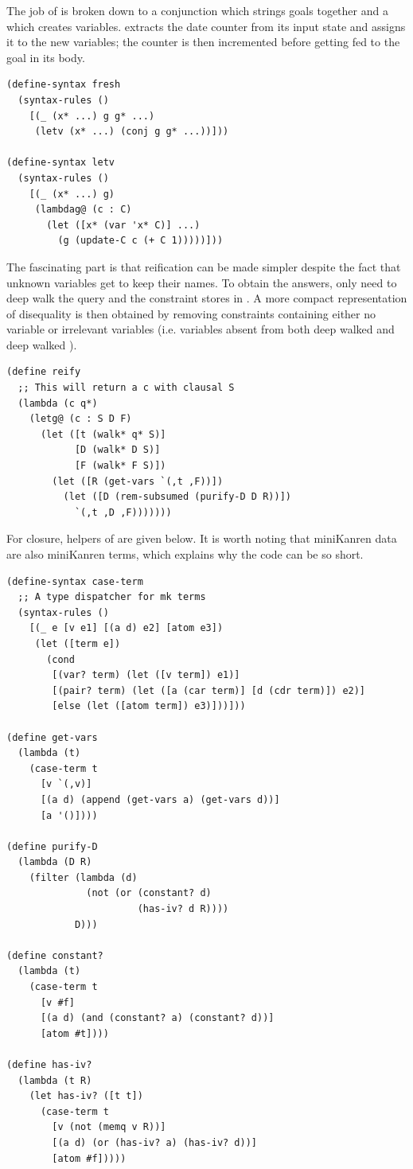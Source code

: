 The job of  is broken down to a conjunction which strings goals together and a  which creates variables.  extracts the date counter from its input state and assigns it to the new variables; the counter is then incremented before getting fed to the goal in its body.
\begin{lstlisting}
(define-syntax fresh
  (syntax-rules ()
    [(_ (x* ...) g g* ...)
     (letv (x* ...) (conj g g* ...))]))

(define-syntax letv
  (syntax-rules ()
    [(_ (x* ...) g)
     (lambdag@ (c : C)
       (let ([x* (var 'x* C)] ...)
         (g (update-C c (+ C 1)))))]))
\end{lstlisting}

The fascinating part is that reification can be made simpler despite the fact that unknown variables get to keep their names. To obtain the answers,  only need to deep walk the query and the constraint stores in . A more compact representation of disequality is then obtained by removing constraints containing either no variable or irrelevant variables (i.e. variables absent from both deep walked  and deep walked ).
\begin{lstlisting}
(define reify
  ;; This will return a c with clausal S
  (lambda (c q*)
    (letg@ (c : S D F)
      (let ([t (walk* q* S)]
            [D (walk* D S)]
            [F (walk* F S)])
        (let ([R (get-vars `(,t ,F))])
          (let ([D (rem-subsumed (purify-D D R))])
            `(,t ,D ,F)))))))
\end{lstlisting}

For closure, helpers of  are given below. It is worth noting that miniKanren data are also miniKanren terms, which explains why the code can be so short.
\begin{lstlisting}
(define-syntax case-term
  ;; A type dispatcher for mk terms
  (syntax-rules ()
    [(_ e [v e1] [(a d) e2] [atom e3])
     (let ([term e])
       (cond
        [(var? term) (let ([v term]) e1)]
        [(pair? term) (let ([a (car term)] [d (cdr term)]) e2)]
        [else (let ([atom term]) e3)]))]))

(define get-vars
  (lambda (t)
    (case-term t
      [v `(,v)]
      [(a d) (append (get-vars a) (get-vars d))]
      [a '()])))

(define purify-D
  (lambda (D R)
    (filter (lambda (d)
              (not (or (constant? d)
                       (has-iv? d R))))
            D)))

(define constant?
  (lambda (t)
    (case-term t
      [v #f]
      [(a d) (and (constant? a) (constant? d))]
      [atom #t])))

(define has-iv?
  (lambda (t R)
    (let has-iv? ([t t])
      (case-term t
        [v (not (memq v R))]
        [(a d) (or (has-iv? a) (has-iv? d))]
        [atom #f]))))
\end{lstlisting}

